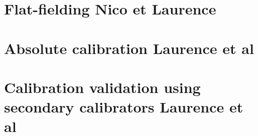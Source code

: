 \documentclass[a4paper, 11pt]{article} %
\begin{document}
\clearpage
\section{Flat-fielding {\color{blue} Nico et Laurence} }
\label{se:flat_field}




\clearpage
\section{Absolute calibration {\color{blue} Laurence et al}}
\label{se:calibration}


\label{se:cal_HA}


\label{se:ref_flux_primaries}


\label{se:baseline_calibration}


\label{se:allscan_calibration}
  

\clearpage
\section{Calibration validation using secondary calibrators {\color{blue} Laurence et al}}
\label{se:photometry}


\label{se:ref_flux_secondaries}


\label{se:valid_baseline_cal}



\label{se:valid_photocorr_cal}
\end{document}
